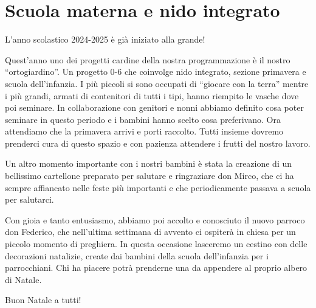 \section{Scuola materna e nido integrato}

L’anno scolastico 2024-2025 è già iniziato alla grande!

Quest’anno uno dei progetti cardine della nostra programmazione è il nostro “ortogiardino”. Un progetto 0-6 che coinvolge nido integrato, sezione primavera e scuola dell’infanzia. I più piccoli si sono occupati di “giocare con la terra” mentre i più grandi, armati di contenitori di tutti i tipi, hanno riempito le vasche dove poi seminare. In collaborazione con genitori e nonni abbiamo definito cosa poter seminare in questo periodo e i bambini hanno scelto cosa preferivano. Ora attendiamo che la primavera arrivi e porti raccolto. Tutti insieme dovremo prenderci cura di questo spazio e con pazienza attendere i frutti del nostro lavoro.


Un altro momento importante con i nostri bambini è stata la creazione di un bellissimo cartellone preparato per salutare e ringraziare don Mirco, che ci ha sempre affiancato nelle feste più importanti e che periodicamente passava a scuola per salutarci.

Con gioia e tanto entusiasmo, abbiamo poi accolto e conosciuto il nuovo parroco don Federico, che nell’ultima settimana di avvento ci ospiterà in chiesa per un piccolo momento di preghiera. In questa occasione lasceremo un cestino con delle decorazioni natalizie, create dai bambini della scuola dell’infanzia per i parrocchiani. Chi ha piacere potrà prenderne una da appendere al proprio albero di Natale. 

Buon Natale a tutti!


